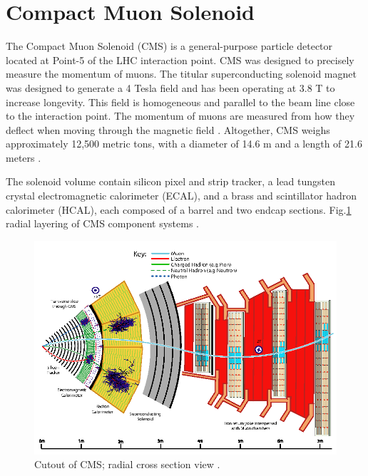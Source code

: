 \section{Compact Muon Solenoid}

The Compact Muon Solenoid (CMS) is a general-purpose particle detector located at Point-5 of the LHC interaction point. CMS was designed to precisely measure the momentum of muons. The titular superconducting solenoid magnet was designed to generate a 4 Tesla field and has been operating at 3.8 T to increase longevity. This field is homogeneous and parallel to the beam line close to the interaction point. The momentum of muons are measured from how they deflect when moving through the magnetic field \cite{CmsPTdrv2}. Altogether, CMS weighs approximately 12,500 metric tons, with a diameter of 14.6 m and a length of 21.6 meters \cite{dEnterria:2007iyi}. 

The solenoid volume contain silicon pixel and strip tracker, a lead tungsten crystal electromagnetic calorimeter (ECAL), and a brass and scintillator hadron calorimeter (HCAL), each composed of a barrel and two endcap sections. Fig.\ref{fig:cmsCutOutZY} radial layering of CMS component systems \cite{10.1088/978-1-6817-4078-2ch4}.

\begin{figure}[]
\begin{centering}
\includegraphics[width=5.5in]{Chapter3/importfigs/Figure_001.png}
\par\end{centering}
\caption{Cutout of CMS; radial cross section view \cite{10.1088/978-1-6817-4078-2ch4}. \label{fig:cmsCutOutZY}}
\end{figure}

